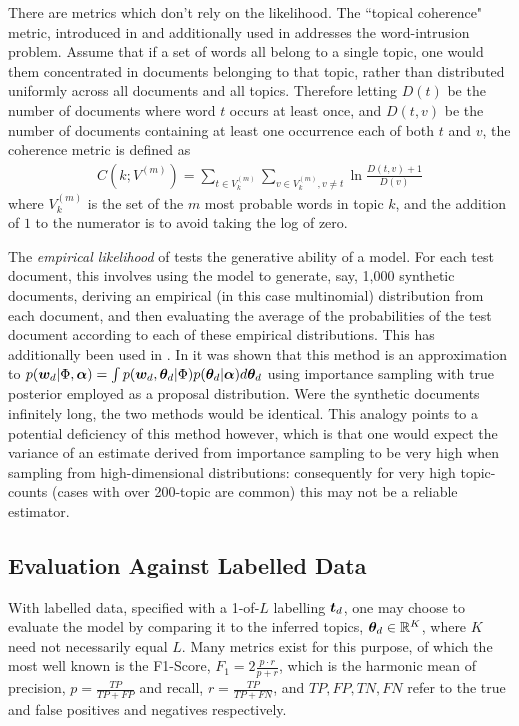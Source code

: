 There are metrics which don't rely on the likelihood. The ``topical coherence" metric, introduced in \cite{Mimno2011} and additionally used in \cite{Mimno2012a} addresses the word-intrusion problem. Assume that if a set of words all belong to a single topic, one would them concentrated in documents belonging to that topic, rather than distributed uniformly across all documents and all topics. Therefore letting $D(t)$ be the number of documents where word $t$ occurs at least once, and $D(t,v)$ be the number of documents containing at least one occurrence each of both $t$ and $v$, the coherence metric is defined as
\begin{align}
C(k; V^{(m)}) = \sum_{t \in V^{(m)}_k} \sum_{v \in V^{(m)}_k,  v \neq t} \ln \frac{D(t, v) + 1}{D(v)}
\end{align}
where $V^{(m)}_k$ is the set of the $m$ most probable words in topic $k$, and the addition of $1$ to the numerator is to avoid taking the log of zero. 


The \emph{empirical likelihood} of \cite{Li2006} tests the generative ability of a model. For each test document, this involves using the model to generate, say, 1,000 synthetic documents, deriving an empirical (in this case multinomial) distribution from each document, and then evaluating the average of the probabilities of the test document according to each of these empirical distributions. This has additionally been used in \cite{Doyle2009}\cite{Mimno2008}. In \cite{Wallach2009} it was shown that this method is an approximation to $p(\bm w_d|\Phi, \bm \alpha) = \int p(\bm w_d, { \bm \theta_d } | \Phi)p({ \bm \theta_d }|\bm \alpha)d{ \bm \theta_d }$ using importance sampling with true posterior employed as a proposal distribution. Were the synthetic documents infinitely long, the two methods would be identical. This analogy points to a potential deficiency of this method however, which is that one would expect the variance of an estimate derived from importance sampling to be very high when sampling from high-dimensional distributions: consequently for very high topic-counts (cases with over 200-topic are common) this may not be a reliable estimator.

\subsection*{Evaluation Against Labelled Data}
With labelled data, specified with a 1-of-$L$ labelling $\bm t_d$, one may choose to evaluate the model by comparing it to the inferred topics, ${ \bm \theta_d } \in { \mathbb{R}^{K} }$, where $K$ need not necessarily equal $L$. Many metrics exist for this purpose, of which the most well known is the F1-Score, $F_1 = 2 \frac{p \cdot r}{p + r}$, which is the harmonic mean of precision, $p=\frac{TP}{TP+FP}$ and recall, $r=\frac{TP}{TP+FN}$, and $TP, FP, TN, FN$ refer to the true and false positives and negatives respectively.

